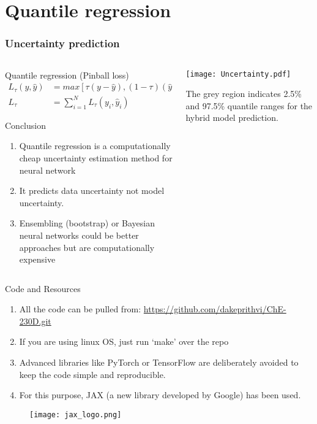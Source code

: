 \documentclass[dvipsnames, 9pt]{beamer}
\begin{document}
\section{Quantile regression}
\begin{frame}
    \frametitle{Uncertainty prediction}
    
    \begin{columns}
    {   \begin{column}{0.5\textwidth}
        \begin{block}{Quantile regression (Pinball loss)}
        \begin{align*}
        L_{\tau}(y,\hat{y}) &= max[\tau (y - \hat{y}), (1  - \tau) (\hat{y} - y)] \\
        L_{\tau} &= \sum_{i=1}^N L_{\tau} (y_i,\hat{y}_i)
        \end{align*}
        \end{block}
        \begin{block}{Conclusion}
        \begin{enumerate}
        \item Quantile regression is a computationally cheap uncertainty estimation method for neural network
        \item It predicts data uncertainty not model uncertainty.
        \item Ensembling (bootstrap) or Bayesian neural networks could be better approaches but are computationally expensive
        \end{enumerate}
        \end{block}
        \end{column}}
        \begin{column}{0.5\textwidth}
        \texttt{[image: Uncertainty.pdf]}
        \begin{center}
        \scriptsize{The grey region indicates 2.5\% and 97.5\% quantile ranges for the hybrid model prediction.}
        \end{center}
        \end{column}
    \end{columns}
\end{frame}


\begin{frame}{Code and Resources}
\begin{enumerate}
\item All the code can be pulled from: \url{https://github.com/dakeprithvi/ChE-230D.git}
\item If you are using linux OS, just run `make' over the repo
\item Advanced libraries like PyTorch or TensorFlow are deliberately avoided to keep the code simple and reproducible.
\item For this purpose, JAX (a new library developed by Google) has been used. 
\end{enumerate}
\begin{figure}[H]
\centering
\texttt{[image: jax\_logo.png]}
\end{figure}
\end{frame}
\end{document}
